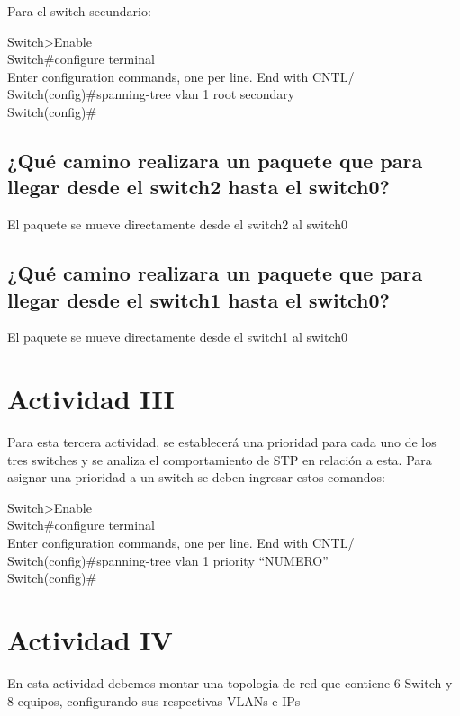 \documentclass[spanish]{udpreport}
\begin{document}
Para el switch secundario:

\begin{flushleft}
	Switch>Enable \\
	Switch\#configure terminal\\
	Enter configuration commands, one per line. End with CNTL/\\
	Switch(config)\#spanning-tree vlan 1 root secondary\\
	Switch(config)\#\\
\end{flushleft}


\subsection{¿Qué camino realizara un paquete que para llegar desde el switch2 hasta el switch0?}
El paquete se mueve directamente desde el switch2 al switch0
\subsection{¿Qué camino realizara un paquete que para llegar desde el switch1 hasta el switch0?}
El paquete se mueve directamente desde el switch1 al switch0


\section{Actividad III}
Para esta tercera actividad, se establecerá una prioridad para cada uno de los tres switches y se analiza el comportamiento de STP en relación a esta. Para asignar una prioridad a un switch se deben ingresar estos comandos:

\begin{flushleft}	
	Switch>Enable\\
	Switch\#configure terminal\\
	Enter configuration commands, one per line. End with CNTL/\\
	Switch(config)\#spanning-tree vlan 1 priority “NUMERO”\\
	Switch(config)\#	\\
\end{flushleft}


\section{Actividad IV}

En esta actividad debemos montar una topologia de red que contiene 6 Switch y 8 equipos, configurando sus respectivas VLANs e IPs
\end{document}
